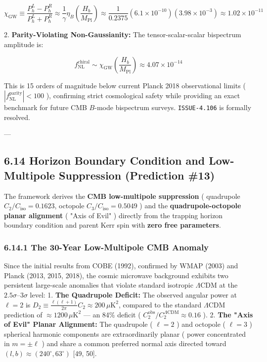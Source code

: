 \documentclass[11pt,a4paper]{article}
\theoremstyle{definition}
\theoremstyle{remark}
\begin{document}
\begin{equation}
\chi_{\text{GW}} \equiv \frac{P_h^L - P_h^R}{P_h^L + P_h^R} \approx \frac{1}{\gamma} \eta_B \left(\frac{H_b}{M_{\text{Pl}}}\right) \approx \frac{1}{0.2375} (6.1 \times 10^{-10}) (3.98 \times 10^{-3}) \approx 1.02 \times 10^{-11}
\end{equation}


2. \textbf{Parity-Violating Non-Gaussianity:} The tensor-scalar-scalar bispectrum amplitude is:


\begin{equation}
f_{\text{NL}}^{\text{chiral}} \sim \chi_{\text{GW}} \left(\frac{H_b}{M_{\text{Pl}}}\right) \approx 4.07 \times 10^{-14}
\end{equation}


This is 15 orders of magnitude below current Planck 2018 observational limits ( $|f_{\text{NL}}^{\text{parity}}| < 100$ ), confirming strict cosmological safety while providing an exact benchmark for future CMB $B$-mode bispectrum surveys. \texttt{ISSUE-4.106} is formally resolved.

---

\subsection{6.14 Horizon Boundary Condition and Low-Multipole Suppression (Prediction \#13)}

The framework derives the \textbf{CMB low-multipole suppression} ( quadrupole $C_2/C_{\text{iso}} = 0.1623$, octopole $C_3/C_{\text{iso}} = 0.5049$ ) and the \textbf{quadrupole-octopole planar alignment} ( "Axis of Evil" ) directly from the trapping horizon boundary condition and parent Kerr spin with \textbf{zero free parameters}.

\subsubsection{6.14.1 The 30-Year Low-Multipole CMB Anomaly}
Since the initial results from COBE (1992), confirmed by WMAP (2003) and Planck (2013, 2015, 2018), the cosmic microwave background exhibits two persistent large-scale anomalies that violate standard isotropic $\Lambda\text{CDM}$ at the $2.5\sigma\text{--}3\sigma$ level:
1. \textbf{The Quadrupole Deficit:} The observed angular power at $\ell = 2$ is $D_2 \equiv \frac{\ell(\ell+1)}{2\pi} C_2 \approx 200 \, \mu\text{K}^2$, compared to the standard $\Lambda\text{CDM}$ prediction of $\approx 1200 \, \mu\text{K}^2$ — an 84\% deficit ( $C_2^{\text{obs}}/C_2^{\Lambda\text{CDM}} \approx 0.16$ ).
2. \textbf{The "Axis of Evil" Planar Alignment:} The quadrupole ( $\ell = 2$ ) and octopole ( $\ell = 3$ ) spherical harmonic components are extraordinarily planar ( power concentrated in $m = \pm \ell$ ) and share a common preferred normal axis directed toward $(l, b) \approx (240^\circ, 63^\circ)$ [49, 50].
\end{document}
